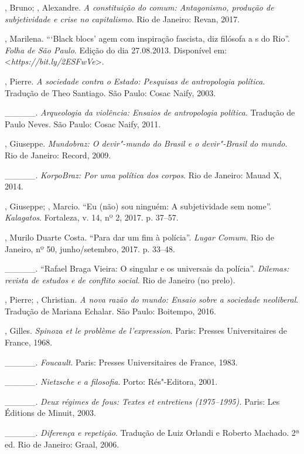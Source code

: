 \begin{Parskip}
, Bruno; , Alexandre. \emph{A constituição do comum:
Antagonismo, produção de subjetividade e crise no capitalismo}. Rio de
Janeiro: Revan, 2017.

, Marilena. ```Black blocs' agem com inspiração fascista, diz
filósofa a s do Rio''. \emph{Folha de São Paulo}. Edição do dia
27.08.2013. Disponível em:
\textless{}\emph{https://bit.ly/2ESFwVe}\textgreater{}.

, Pierre. \emph{A sociedade contra o Estado: Pesquisas
de antropologia política}. Tradução de Theo Santiago. São Paulo: Cosac
Naify, 2003.

\_\_\_\_\_. \emph{Arqueologia da violência: Ensaios de
antropologia política}. Tradução de Paulo Neves. São Paulo: Cosac Naify, 2011.

, Giuseppe. \emph{Mundobraz: O devir"-mundo do Brasil e o
devir"-Brasil do mundo}. Rio de Janeiro: Record, 2009.

\_\_\_\_\_. \emph{KorpoBraz: Por uma política dos corpos}. Rio de
Janeiro: Mauad X, 2014.

, Giuseppe; , Marcio. ``Eu (não) sou ninguém: A
subjetividade sem nome''. \emph{Kalagatos}. Fortaleza, v. 14, nº 2, 2017. p.
37--57.

, Murilo Duarte Costa. ``Para dar um fim à polícia''.
\emph{Lugar Comum}. Rio de Janeiro, nº 50, junho/setembro, 2017. p. 33--48.

\_\_\_\_\_. ``Rafael Braga Vieira: O singular e os universais da
polícia''. \emph{Dilemas: revista de estudos e de conflito social}. Rio de
Janeiro (no prelo).

, Pierre; , Christian. \emph{A nova razão do mundo:
Ensaio sobre a sociedade neoliberal}. Tradução de Mariana Echalar. São
Paulo: Boitempo, 2016.

, Gilles. \emph{Spinoza et le problème de l'expression}.
Paris: Presses Universitaires de France, 1968.

\_\_\_\_\_. \emph{Foucault}. Paris: Presses Universitaires de
France, 1983.

\_\_\_\_\_. \emph{Nietzsche e a filosofia}. Porto: Rés"-Editora, 2001.

\_\_\_\_\_. \emph{Deux régimes de fous: Textes et entretiens
(1975--1995).} Paris: Les Éditions de Minuit, 2003.

\_\_\_\_\_. \emph{Diferença e repetição}. Tradução de Luiz
Orlandi e Roberto Machado. 2ª ed. Rio de Janeiro: Graal, 2006.


\end{Parskip}
